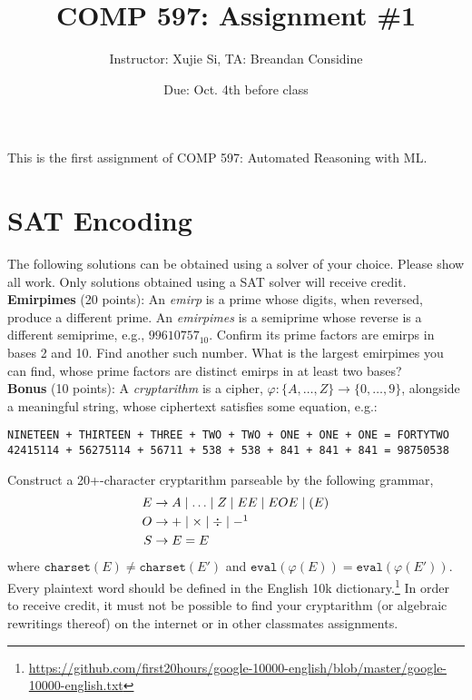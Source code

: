 \documentclass[11pt]{article}
\author{Instructor: Xujie Si, TA: Breandan Considine}
\date{Due: Oct. 4th before class}
\title{COMP 597: Assignment \#1}
\begin{document}
    \maketitle
    \noindent This is the first assignment of COMP 597: Automated Reasoning with ML.


    \section{SAT Encoding}

    The following solutions can be obtained using a solver of your choice. Please show all work. Only solutions obtained using a SAT solver will receive credit.\\

    \noindent \textbf{Emirpimes} (20 points): An \textit{emirp} is a prime whose digits, when reversed, produce a different prime. An \textit{emirpimes} is a semiprime whose reverse is a different semiprime, e.g., $99610757_{10}$. Confirm its prime factors are emirps in bases 2 and 10. Find another such number. What is the largest emirpimes you can find, whose prime factors are distinct emirps in at least two bases?\\

    \noindent \textbf{Bonus} (10 points): A \textit{cryptarithm} is a cipher, $\varphi: \{A,\ldots, Z\}\rightarrow \{0, \ldots, 9\}$, alongside a meaningful string, whose ciphertext satisfies some equation, e.g.:

    \begin{lstlisting}[basicstyle=\scriptsize\ttfamily]
NINETEEN + THIRTEEN + THREE + TWO + TWO + ONE + ONE + ONE = FORTYTWO
42415114 + 56275114 + 56711 + 538 + 538 + 841 + 841 + 841 = 98750538
    \end{lstlisting}

    \noindent Construct a 20+-character cryptarithm parseable by the following grammar,
    \begin{align*}
E &\rightarrow A \mid \ldots \mid Z \mid EE \mid E O E \mid ( E )\\
O &\rightarrow + \mid \times \mid \div \mid -\footnotemark\\
S &\rightarrow E = E
    \end{align*}
    \noindent where $\texttt{charset}(E) \neq \texttt{charset}(E')$ and $\texttt{eval}(\varphi(E)) = \texttt{eval}(\varphi(E'))$. Every plaintext word should be defined in the English 10k dictionary.\footnote{\tiny\url{https://github.com/first20hours/google-10000-english/blob/master/google-10000-english.txt}} In order to receive credit, it must not be possible to find your cryptarithm (or algebraic rewritings thereof) on the internet or in other classmates assignments.\\
\end{document}
